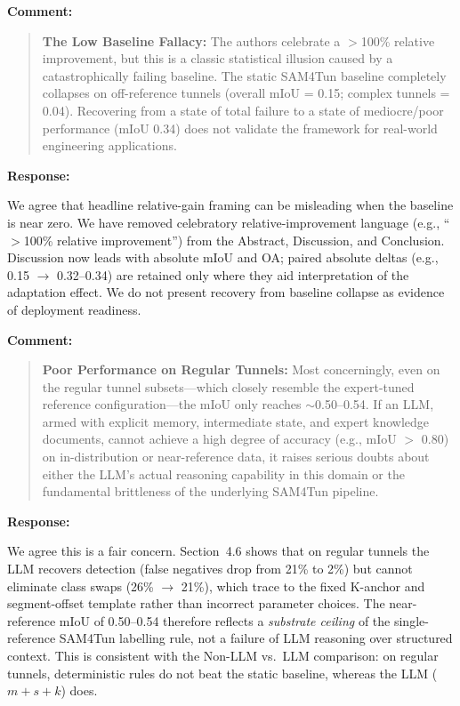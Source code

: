 \documentclass[11pt,a4paper]{article}
\newenvironment{commentblock}{%
  \par\smallskip\noindent\textbf{Comment:}\par
  \begin{quote}\itshape\color{black}
}{%
  \end{quote}\smallskip
}
\newenvironment{responseblock}{%
  \par\smallskip\noindent\textbf{Response:}\par
  \begingroup\color{responsegreen}
}{%
  \endgroup\smallskip
}
\begin{document}
\begin{commentblock}
\textbf{The Low Baseline Fallacy:} The authors celebrate a $>$100\% relative improvement, but this is a classic statistical illusion caused by a catastrophically failing baseline. The static SAM4Tun baseline completely collapses on off-reference tunnels (overall mIoU = 0.15; complex tunnels = 0.04). Recovering from a state of total failure to a state of mediocre/poor performance (mIoU 0.34) does not validate the framework for real-world engineering applications.
\end{commentblock}
\begin{responseblock}
We agree that headline relative-gain framing can be misleading when the baseline is near zero. We have removed celebratory relative-improvement language (e.g., ``$>$100\% relative improvement'') from the Abstract, Discussion, and Conclusion. Discussion now leads with absolute mIoU and OA; paired absolute deltas (e.g., 0.15 $\rightarrow$ 0.32--0.34) are retained only where they aid interpretation of the adaptation effect. We do not present recovery from baseline collapse as evidence of deployment readiness.
\end{responseblock}

\begin{commentblock}
\textbf{Poor Performance on Regular Tunnels:} Most concerningly, even on the regular tunnel subsets---which closely resemble the expert-tuned reference configuration---the mIoU only reaches $\sim$0.50--0.54. If an LLM, armed with explicit memory, intermediate state, and expert knowledge documents, cannot achieve a high degree of accuracy (e.g., mIoU $>$ 0.80) on in-distribution or near-reference data, it raises serious doubts about either the LLM's actual reasoning capability in this domain or the fundamental brittleness of the underlying SAM4Tun pipeline.
\end{commentblock}
\begin{responseblock}
We agree this is a fair concern. Section~4.6 shows that on regular tunnels the LLM recovers detection (false negatives drop from 21\% to 2\%) but cannot eliminate class swaps (26\% $\rightarrow$ 21\%), which trace to the fixed K-anchor and segment-offset template rather than incorrect parameter choices. The near-reference mIoU of 0.50--0.54 therefore reflects a \emph{substrate ceiling} of the single-reference SAM4Tun labelling rule, not a failure of LLM reasoning over structured context. This is consistent with the Non-LLM vs.\ LLM comparison: on regular tunnels, deterministic rules do not beat the static baseline, whereas the LLM ($m+s+k$) does.
\end{responseblock}
\end{document}
